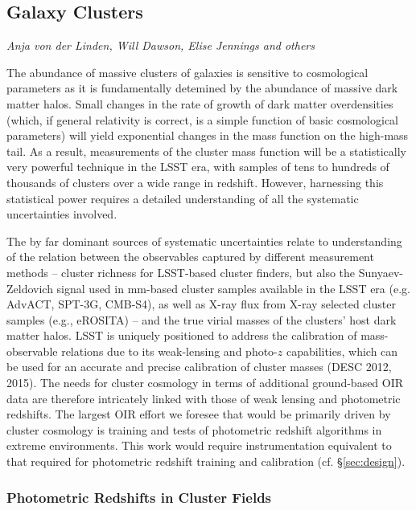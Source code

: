 
\subsection{Galaxy Clusters}
\label{sec:clusters}
{\it Anja von der Linden, Will Dawson, Elise Jennings and others}

The abundance of massive clusters of galaxies is sensitive to cosmological parameters as it is fundamentally detemined by the abundance of massive dark matter halos.  Small changes in the rate of growth of dark matter overdensities (which, if general relativity is correct, is a simple function of basic cosmological parameters) will yield exponential changes in the mass function on the high-mass tail.  As a result, measurements of the cluster mass function will be a statistically very powerful technique in the LSST era, with samples of tens to hundreds of thousands of clusters over a wide range in redshift.  However, harnessing this statistical power requires a detailed understanding of all the systematic uncertainties involved.  

The by far dominant sources of systematic uncertainties relate to understanding of the relation between the observables captured by different measurement methods -- cluster richness for LSST-based cluster finders, but also the Sunyaev-Zeldovich signal used in mm-based cluster samples available in the LSST era (e.g. AdvACT, SPT-3G, CMB-S4), as well as X-ray flux from X-ray selected cluster samples (e.g., eROSITA) -- and the true virial masses of the clusters' host dark matter halos.  LSST is uniquely positioned to address the calibration of mass-observable relations due to its weak-lensing and photo-$z$ capabilities, which can be used for an accurate and precise calibration of cluster masses (DESC 2012, 2015).  The needs for cluster cosmology in terms of additional ground-based OIR data are therefore intricately linked with those of weak lensing and photometric redshifts.  The largest OIR effort we foresee that would be primarily driven by cluster cosmology is training and tests of photometric redshift algorithms in extreme environments.  This work would require instrumentation equivalent to that required for photometric redshift training and calibration (cf. \S \ref{sec:design}).



\subsubsection{Photometric Redshifts in Cluster Fields}

